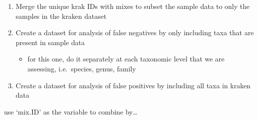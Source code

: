 \documentclass[
]{article}
\providecommand{\tightlist}{%
  \setlength{\itemsep}{0pt}\setlength{\parskip}{0pt}}
\begin{document}
\begin{enumerate}
\def\labelenumi{\arabic{enumi}.}
\tightlist
\item
  Merge the unique krak IDs with mixes to subset the sample data to only
  the samples in the kraken dataset
\item
  Create a dataset for analysis of false negatives by only including
  taxa that are present in sample data

  \begin{itemize}
  \tightlist
  \item
    for this one, do it separately at each taxonomic level that we are
    assessing, i.e.~species, genus, family
  \end{itemize}
\item
  Create a dataset for analysis of false positives by including all taxa
  in kraken data
\end{enumerate}

use `mix.ID' as the variable to combine by\ldots{}
\end{document}
